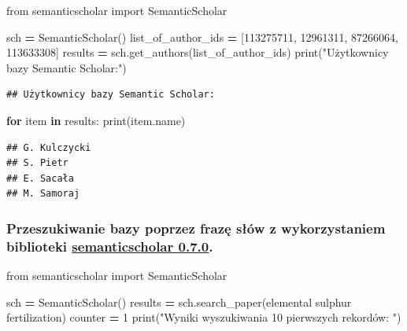 \documentclass[
  12pt,
]{article}
\newenvironment{Shaded}{\begin{snugshade}}{\end{snugshade}}
\newcommand{\BuiltInTok}[1]{#1}
\newcommand{\ControlFlowTok}[1]{\textcolor[rgb]{0.13,0.29,0.53}{\textbf{#1}}}
\newcommand{\DecValTok}[1]{\textcolor[rgb]{0.00,0.00,0.81}{#1}}
\newcommand{\ImportTok}[1]{#1}
\newcommand{\KeywordTok}[1]{\textcolor[rgb]{0.13,0.29,0.53}{\textbf{#1}}}
\newcommand{\NormalTok}[1]{#1}
\newcommand{\OperatorTok}[1]{\textcolor[rgb]{0.81,0.36,0.00}{\textbf{#1}}}
\newcommand{\StringTok}[1]{\textcolor[rgb]{0.31,0.60,0.02}{#1}}
\begin{document}
\begin{Shaded}
\begin{Highlighting}[]
\ImportTok{from}\NormalTok{ semanticscholar }\ImportTok{import}\NormalTok{ SemanticScholar}

\NormalTok{sch }\OperatorTok{=}\NormalTok{ SemanticScholar()}
\NormalTok{list\_of\_author\_ids }\OperatorTok{=}\NormalTok{ [}\StringTok{\textquotesingle{}113275711\textquotesingle{}}\NormalTok{, }\StringTok{\textquotesingle{}12961311\textquotesingle{}}\NormalTok{, }\StringTok{\textquotesingle{}87266064\textquotesingle{}}\NormalTok{, }\StringTok{\textquotesingle{}113633308\textquotesingle{}}\NormalTok{]}
\NormalTok{results }\OperatorTok{=}\NormalTok{ sch.get\_authors(list\_of\_author\_ids)}
\BuiltInTok{print}\NormalTok{(}\StringTok{"Użytkownicy bazy Semantic Scholar:"}\NormalTok{)}
\end{Highlighting}
\end{Shaded}

\begin{verbatim}
## Użytkownicy bazy Semantic Scholar:
\end{verbatim}

\begin{Shaded}
\begin{Highlighting}[]
\ControlFlowTok{for}\NormalTok{ item }\KeywordTok{in}\NormalTok{ results:}
    \BuiltInTok{print}\NormalTok{(item.name)}
\end{Highlighting}
\end{Shaded}

\begin{verbatim}
## G. Kulczycki
## S. Pietr
## E. Sacała
## M. Samoraj
\end{verbatim}

\hypertarget{przeszukiwanie-bazy-poprzez-frazux119-sux142uxf3w-z-wykorzystaniem-biblioteki-semanticscholar-0.7.0.}{%
\subsubsection{\texorpdfstring{Przeszukiwanie bazy poprzez frazę słów z
wykorzystaniem biblioteki
\href{https://pypi.org/project/semanticscholar}{semanticscholar
0.7.0}.}{Przeszukiwanie bazy poprzez frazę słów z wykorzystaniem biblioteki semanticscholar 0.7.0.}}\label{przeszukiwanie-bazy-poprzez-frazux119-sux142uxf3w-z-wykorzystaniem-biblioteki-semanticscholar-0.7.0.}}

\begin{Shaded}
\begin{Highlighting}[]
\ImportTok{from}\NormalTok{ semanticscholar }\ImportTok{import}\NormalTok{ SemanticScholar}

\NormalTok{sch }\OperatorTok{=}\NormalTok{ SemanticScholar()}
\NormalTok{results }\OperatorTok{=}\NormalTok{ sch.search\_paper(}\StringTok{\textquotesingle{}elemental sulphur fertilization\textquotesingle{}}\NormalTok{)}
\NormalTok{counter }\OperatorTok{=} \DecValTok{1}
\BuiltInTok{print}\NormalTok{(}\StringTok{"Wyniki wyszukiwania 10 pierwszych rekordów: "}\NormalTok{)}
\end{Highlighting}
\end{Shaded}
\end{document}
